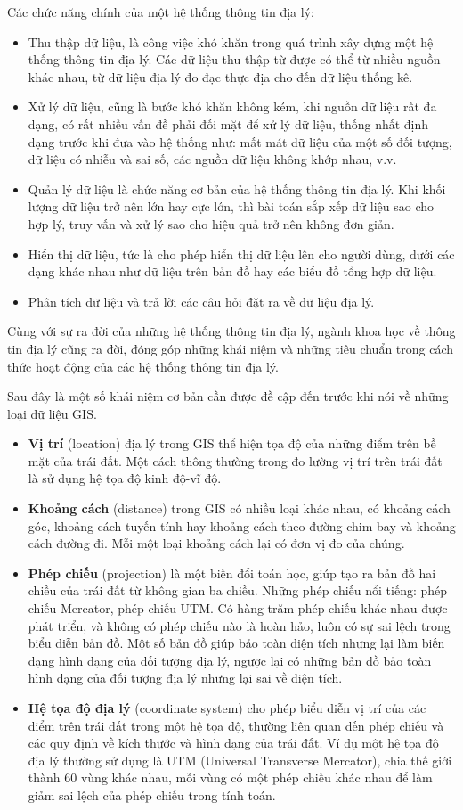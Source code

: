 \documentclass[14pt, oneside, a4paper, openany]{scrartcl}
\begin{document}
Các chức năng chính của một hệ thống thông tin địa lý:
\begin{itemize}
	\item Thu thập dữ liệu, là công việc khó khăn trong quá trình xây dựng một hệ thống thông tin địa lý. Các dữ liệu thu thập từ được có thể từ nhiều nguồn khác nhau, từ dữ liệu địa lý đo đạc thực địa cho đến dữ liệu thống kê.
	\item Xử lý dữ liệu, cũng là bước khó khăn không kém, khi nguồn dữ liệu rất đa dạng, có rất nhiều vấn đề phải đối mặt để xử lý dữ liệu, thống nhất định dạng trước khi đưa vào hệ thống như: mất mát dữ liệu của một số đối tượng, dữ liệu có nhiễu và sai số, các nguồn dữ liệu không khớp nhau, v.v.
	\item Quản lý dữ liệu là chức năng cơ bản của hệ thống thông tin địa lý. Khi khối lượng dữ liệu trở nên lớn hay cực lớn, thì bài toán sắp xếp dữ liệu sao cho hợp lý, truy vấn và xử lý sao cho hiệu quả trở nên không đơn giản.
	\item Hiển thị dữ liệu, tức là cho phép hiển thị dữ liệu lên cho người dùng, dưới các dạng khác nhau như dữ liệu trên bản đồ hay các biểu đồ tổng hợp dữ liệu.
	\item Phân tích dữ liệu và trả lời các câu hỏi đặt ra về dữ liệu địa lý.
\end{itemize}

Cùng với sự ra đời của những hệ thống thông tin địa lý, ngành khoa học về thông tin  địa lý cũng ra đời, đóng góp những khái niệm và những tiêu chuẩn trong cách thức hoạt động của các hệ thống thông tin địa lý.

Sau đây là một số khái niệm cơ bản cần được đề cập đến trước khi nói về những loại dữ liệu GIS.
\begin{itemize}
	\item \textbf{Vị trí} (location) địa lý trong GIS thể hiện tọa độ của những điểm trên bề mặt của trái đất. Một cách thông thường trong đo lường vị trí trên trái đất là sử dụng hệ tọa độ kinh độ-vĩ độ.	
	\item \textbf{Khoảng cách} (distance) trong GIS có nhiều loại khác nhau, có khoảng cách góc, khoảng cách tuyến tính hay khoảng cách theo đường chim bay và khoảng cách đường đi. Mỗi một loại khoảng cách lại có đơn vị đo của chúng.
	\item \textbf{Phép chiếu} (projection) là một biến đổi toán học, giúp tạo ra bản đồ hai chiều của trái đất từ không gian ba chiều. Những phép chiếu nổi tiếng: phép chiếu Mercator, phép chiếu UTM.
	Có hàng trăm phép chiếu khác nhau được phát triển, và không có phép chiếu nào là hoàn hảo, luôn có sự sai lệch trong biểu diễn bản đồ. Một số bản đồ giúp bảo toàn diện tích nhưng lại làm biến dạng hình dạng của đối tượng địa lý, ngược lại có những bản đồ bảo toàn hình dạng của đối tượng địa lý nhưng lại sai về diện tích.
	\item \textbf{Hệ tọa độ địa lý} (coordinate system) cho phép biểu diễn vị trí của các điểm trên trái đất trong một hệ tọa độ, thường liên quan đến phép chiếu và các quy định về kích thước và hình dạng của trái đất. Ví dụ một hệ tọa độ địa lý thường sử dụng là UTM (Universal Transverse Mercator), chia thế giới thành 60 vùng khác nhau, mỗi vùng có một phép chiếu khác nhau để làm giảm sai lệch của phép chiếu trong tính toán.		
\end{itemize}
\end{document}
